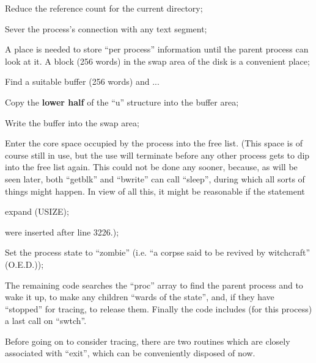 \item[3232:] Reduce the reference count for
 the current directory;

\item[3233:] Sever the process's connection
 with any text segment;

\item[3234:] A place is needed to store ``per
 process'' information until the
 parent process can look at it. A
 block (256 words) in the swap
 area of the disk is a convenient
 place;

\item[3237:] Find a suitable buffer (256
 words) and ...

\item[3238:] Copy the {\bf lower half} of the ``u''
 structure into the buffer area;

\item[3239:] Write the buffer into the swap
 area;

\item[3241:] Enter the core space occupied by
 the process into the free list.
 (This space is of course still in
 use, but the use will terminate
 before any other process gets to
 dip into the free list again.
 This could not be done any
 sooner, because, as will be seen
 later, both ``getblk'' and ``bwrite''
 can call ``sleep'', during which
 all sorts of things might happen.
 In view of all this, it might be
 reasonable if the statement

\begin{center}
 expand (USIZE);
\end{center}

\noindent were inserted after line 3226.);

\item[3243:] Set the process state to ``zombie''
 (i.e. ``a corpse said to be
 revived by witchcraft''\\
(O.E.D.));

\item[3245:] The remaining code searches the
 ``proc'' array to find the parent
 process and to wake it up, to
 make any children ``wards of the
 state'', and, if they have
 ``stopped'' for tracing, to release
 them. Finally the code includes
 (for this process) a last call on
 ``swtch''.
\ed


Before going on to consider tracing,
there are two routines which are
closely associated with ``exit'', which
can be conveniently disposed of now.



